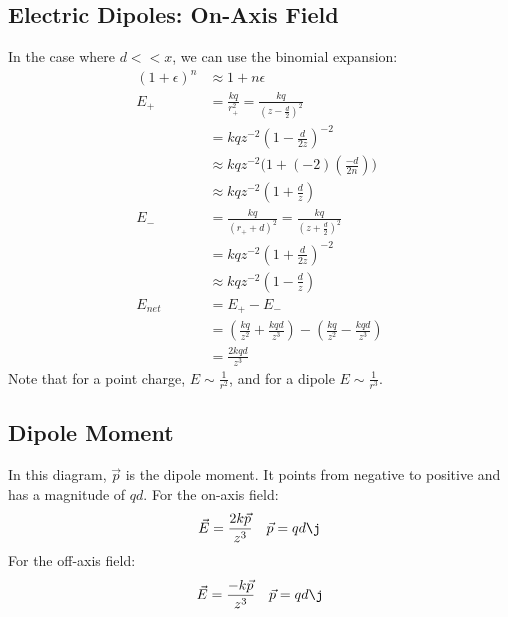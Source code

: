 \documentclass{math}
\begin{document}
\subsection*{Electric Dipoles: On-Axis Field}
\begin{center}
\end{center}
In the case where \( d << x \), we can use the binomial expansion:
\begin{align*}
  (1+\epsilon)^n &\approx 1+n\epsilon \\
  E_{+} &= \frac{kq}{r_{+}^2} = \frac{kq}{(z-\frac{d}{2})^2} \\
  &= kqz^{-2}(1-\frac{d}{2z})^{-2} \\
  &\approx kqz^{-2}\bigg(1+(-2)(\frac{-d}{2n})\bigg) \\
  &\approx kqz^{-2}(1+\frac{d}{z}) \\
  E_{-} &= \frac{kq}{(r_{+}+d)^2} = \frac{kq}{(z+\frac{d}{2})^2} \\
  &= kqz^{-2}(1+\frac{d}{2z})^{-2} \\
  &\approx kqz^{-2}(1-\frac{d}{z}) \\
  E_{net} &= E_{+}-E_{-} \\
  &= (\frac{kq}{z^2}+\frac{kqd}{z^3})-(\frac{kq}{z^2}-\frac{kqd}{z^3}) \\
  &= \frac{2kqd}{z^3}
\end{align*}
Note that for a point charge, \( E\sim\frac{1}{r^2} \), and for a dipole
\( E\sim\frac{1}{r^3} \).

\subsection*{Dipole Moment}
\begin{center}
\end{center}
In this diagram, \( \vec{p} \) is the dipole moment. It points from negative to
positive and has a magnitude of \( qd \). For the on-axis field:
\[ \vec{E} = \frac{2k\vec{p}}{z^3} \quad \vec{p} = qd\j \]
For the off-axis field:
\[ \vec{E} = \frac{-k\vec{p}}{z^3} \quad \vec{p} = qd\j \]
\end{document}
